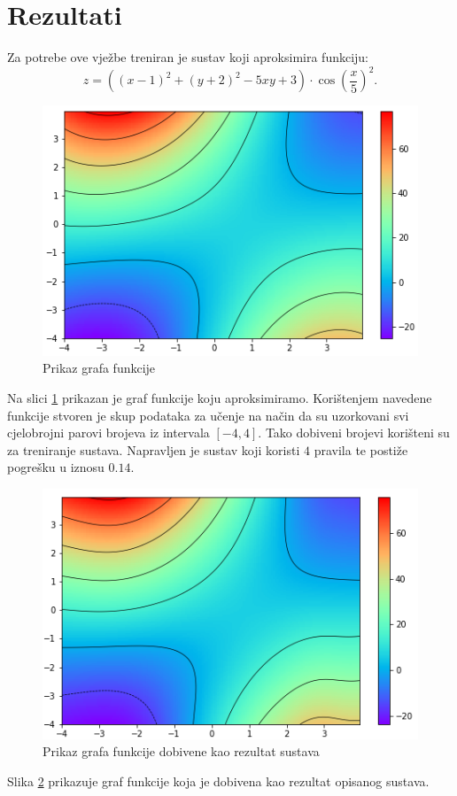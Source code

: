 \documentclass[12pt, a4paper, numeric]{article}
\begin{document}
\section{Rezultati}
Za potrebe ove vježbe treniran je sustav koji aproksimira funkciju:
\[z = ((x-1)^2 + (y+2)^2 - 5 xy + 3) \cdot \cos(\frac{x}{5})^ 2.\]
\begin{figure}[ht!] 
    \centering
    \includegraphics[width=.65\textwidth]{img/expected}
    \captionsetup{justification=centering}
    \caption{Prikaz grafa funkcije}
    \label{fig:grafFunkcije}
\end{figure}
Na slici \ref{fig:grafFunkcije} prikazan je graf funkcije koju aproksimiramo.
Korištenjem navedene funkcije stvoren je skup podataka za učenje na način da su uzorkovani svi cjelobrojni parovi brojeva iz intervala $[-4, 4]$.
Tako dobiveni brojevi korišteni su za treniranje sustava.
Napravljen je sustav koji koristi $4$ pravila te postiže pogrešku u iznosu $0.14$.
\begin{figure}[ht!] 
    \centering
    \includegraphics[width=.65\textwidth]{img/result}
    \captionsetup{justification=centering}
    \caption{Prikaz grafa funkcije dobivene kao rezultat sustava}
    \label{fig:grafRezultat}
\end{figure}
Slika \ref{fig:grafRezultat} prikazuje graf funkcije koja je dobivena kao rezultat opisanog sustava.
\end{document}
